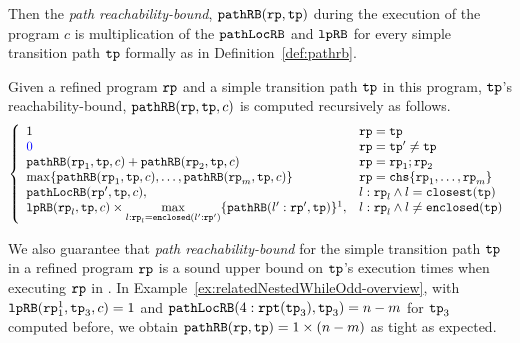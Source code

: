 Then the \emph{path reachability-bound}, $\mathtt{pathRB}(\mathtt{rp}, \mathtt{tp})$ during the execution of the program $c$ is multiplication of the $\mathtt{pathLocRB}$ and $\mathtt{lpRB}$ for every simple transition path $\mathtt{tp}$ formally as in Definition~\ref{def:pathrb}.
%
\begin{defn}
  \label{def:pathrb}
  Given a refined program $\mathtt{rp}$ and a simple transition path $\mathtt{tp}$ in this program, 
  $\mathtt{tp}$'s reachability-bound, $\mathtt{pathRB}(\mathtt{rp}, \mathtt{tp}, c)$
  is computed recursively as follows. 
{\small 
\[
  \left\{ 
  \begin{array}{ll}
    1  & \rprog = \tpath\\
    \highlight{0} & \rprog = \tpath' \neq \tpath\\
    \inoutB(\rprog_1, \tpath, c) + \inoutB(\rprog_2, \tpath, c) & \rprog = \rprog_1;\rprog_2 \\
    \max\left\{ \inoutB(\rprog_1, \tpath, c), \ldots, \inoutB(\rprog_m, \tpath, c) \right\} 
    & \rprog = \rpchoose{\rprog_1, \ldots, \rprog_m } \\
    \outinB(\rprog', \tpath, c), & l: \rprog_l \land l = \kw{closest}(\tpath) \\
    \lpchB(\rprog_l, \tpath , c)
    \times \max\limits_{l:\rprog_l = \kw{enclosed}(l':\rprog')}
   \{\inoutB(l':\rprog', \tpath)\} \footnotemark, & l: \rprog_l \land l \neq \kw{enclosed}(\tpath) \\
  \end{array}
  \right.
  \]
 }
 \end{defn}

We also guarantee that \emph{path reachability-bound} for the simple transition path $\mathtt{tp}$ in a refined program $\mathtt{rp}$ is a sound upper bound on $\mathtt{tp}$'s execution times when executing $\mathtt{rp}$
in .
%
In Example~\ref{ex:relatedNestedWhileOdd-overview}, with $\mathtt{lpRB}(\mathtt{rp}_1^1, \mathtt{tp}_3, c) = 1$ and
$\mathtt{pathLocRB}(4: \mathtt{rpt}(\mathtt{tp}_3), \mathtt{tp}_3) = n - m$ for $\mathtt{tp}_3$ computed before, we obtain $\mathtt{pathRB}(\mathtt{rp}, \mathtt{tp}) = 1 \times (n - m)$ as tight as expected.
